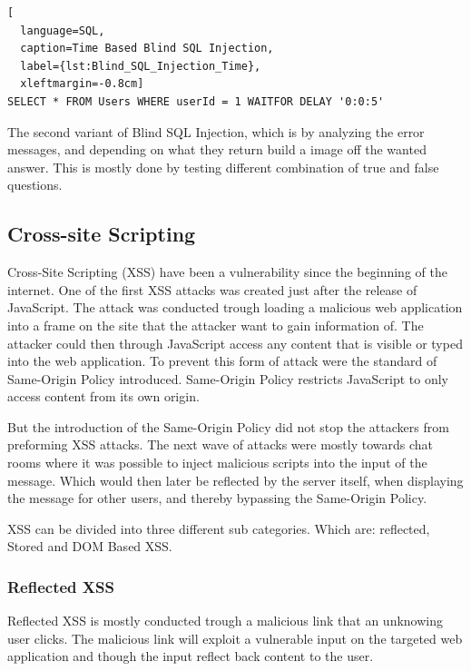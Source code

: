 \hfill
\begin{lstlisting}[
  language=SQL,
  caption=Time Based Blind SQL Injection,
  label={lst:Blind_SQL_Injection_Time},
  xleftmargin=-0.8cm]
SELECT * FROM Users WHERE userId = 1 WAITFOR DELAY '0:0:5'
\end{lstlisting}
\hfill

The second variant of Blind SQL Injection, which is by analyzing the error messages, and depending on what they return build a image off the wanted answer. This is mostly done by testing different combination of true and false questions. \parencite{JustinClarke-Salt2009SIAa, Secure_Web} 


\subsection{Cross-site Scripting}
Cross-Site Scripting (XSS) have been a vulnerability since the beginning of the internet. One of the first XSS attacks was created just after the release of JavaScript. The attack was conducted trough loading a malicious web application into a frame on the site that the attacker want to gain information of. The attacker could then through JavaScript access any content that is visible or typed into the web application. To prevent this form of attack were the standard of Same-Origin Policy introduced. Same-Origin Policy restricts JavaScript to only access content from its own origin. \parencite{FogieSeth2007Xacs, w3csop}

But the introduction of the Same-Origin Policy did not stop the attackers from preforming XSS attacks. The next wave of attacks were mostly towards chat rooms where it was possible to inject malicious scripts into the input of the message. Which would then later be reflected by the server itself, when displaying the message for other users, and thereby bypassing the Same-Origin Policy. \parencite{FogieSeth2007Xacs}

XSS can be divided into three different sub categories. Which are: reflected, Stored and DOM Based XSS.

\subsubsection{Reflected XSS}
Reflected XSS is mostly conducted trough a malicious link that an unknowing user clicks. The malicious link will exploit a vulnerable input on the targeted web application and though the input reflect back content to the user. \parencite{Secure_Web}


